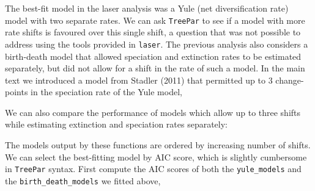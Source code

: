 The best-fit model in the laser analysis was a Yule (net diversification
rate) model with two separate rates. We can ask \texttt{TreePar} to see
if a model with more rate shifts is favoured over this single shift, a
question that was not possible to address using the tools provided in
\texttt{laser}. The previous analysis also considers a birth-death model
that allowed speciation and extinction rates to be estimated separately,
but did not allow for a shift in the rate of such a model. In the main
text we introduced a model from Stadler (2011) that permitted up to 3
change-points in the speciation rate of the Yule model,

\begin{Shaded}
\begin{Highlighting}[]
 \NormalTok{(}\NormalTok{,}\NormalTok{,}\NormalTok{,}\NormalTok{), }
   \NormalTok{, } \NormalTok{, } \NormalTok{, } \NormalTok{)[[}\NormalTok{]]}
\end{Highlighting}
\end{Shaded}
We can also compare the performance of models which allow up to three
shifts while estimating extinction and speciation rates separately:

\begin{Shaded}
\begin{Highlighting}[]
 \NormalTok{(}\NormalTok{,}\NormalTok{,}\NormalTok{,}\NormalTok{), }
   \NormalTok{, } \NormalTok{, } \NormalTok{, } \NormalTok{)[[}\NormalTok{]]}
\end{Highlighting}
\end{Shaded}
The models output by these functions are ordered by increasing number of
shifts.\\We can select the best-fitting model by AIC score, which is
slightly cumbersome in \texttt{TreePar} syntax. First compute the AIC
scores of both the \texttt{yule\_models} and the
\texttt{birth\_death\_models} we fitted above,

